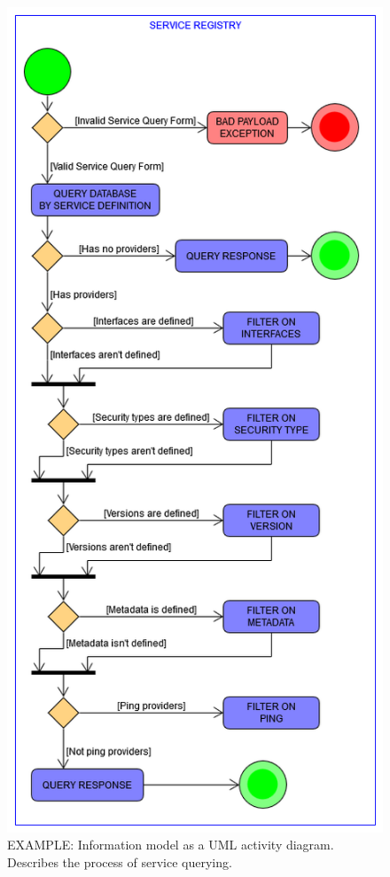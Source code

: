 \documentclass[a4paper]{arrowhead}
\begin{document}
\begin{figure}[ht!]
  \centering
  \includegraphics[width=\textwidth,height=0.9\textheight,keepaspectratio]{figures/post_service_registry_query_activity_uml.png}
  \caption{\color{red}  EXAMPLE:
    Information model as a UML activity diagram. Describes the process
    of service querying.
    \color{black}
  }
  \label{fig:query_overview}
\end{figure}
\end{document}

